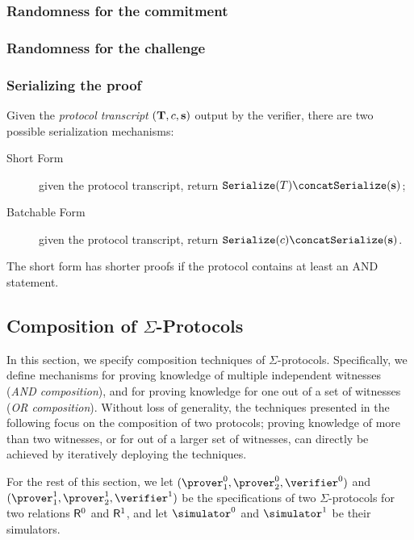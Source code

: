 \documentclass[runningheads,11pt]{article}
\newcommand{\serialize}{\texttt{Serialize}}
\begin{document}
\subsubsection{Randomness for the commitment}
\subsubsection{Randomness for the challenge}

\subsubsection{Serializing the proof}
Given the \emph{protocol transcript} $(\mathbf {T},c,\mathbf s)$ output by the verifier, there are two possible serialization mechanisms:
\begin{description}
\item[Short Form] given the protocol transcript, return $\serialize(T) \concat \serialize(\vec s)$;
\item[Batchable Form] given the protocol transcript, return $\serialize(c) \concat \serialize(\vec s)$.
\end{description}
The short form has shorter proofs if the protocol contains at least an AND statement.


\subsection{Composition of $\Sigma$-Protocols}
\label{sec:composition}
\label{sec:or-comp}
\label{sec:and-comp}
  In this section, we specify composition techniques of $\Sigma$-protocols.
  Specifically, we define mechanisms for proving knowledge of multiple independent witnesses (\emph{AND composition}), and for proving knowledge for one out of a set of witnesses (\emph{OR composition}).
  Without loss of generality, the techniques presented in the following focus on the composition of two protocols;
  proving knowledge of more than two witnesses, or for out of a larger set of witnesses, can directly be achieved by iteratively deploying the techniques.

  For the rest of this section, we let $(\prover_1^0,\prover_2^0,\verifier^0)$ and $(\prover_1^1,\prover_2^1,\verifier^1)$ be the specifications of two $\Sigma$-protocols for two relations $\mathsf{R}^0$ and $\mathsf{R}^1$, and let $\simulator^0$ and $\simulator^1$ be their simulators.
\end{document}
